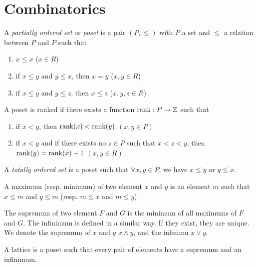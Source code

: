 \section{Combinatorics}

\begin{definition}
  A \textit{partially ordered set} or \textit{poset} is a pair $(P,\le)$ with $P$ a set and $\le$ a relation between $P$ and $P$ such that
  \begin{enumerate}
    \item $x \le x$ ($x \in R$)
    \item if $x \le y$ and $y \le x$, then $x = y$ ($x,y \in R$)
    \item if $x \le y$ and $y \le z$, then $x \le z$ ($x,y,z \in R$)
  \end{enumerate}
\end{definition}

\begin{definition}
  A poset is ranked if there exists a function $\operatorname{rank} : P \to \mathbb Z$ such that
  \begin{enumerate}
    \item if $x < y$, then $\operatorname{rank}(x) < \operatorname{rank}(y)$ $(x, y \in P)$
    \item if $x < y$ and if there exists no $z \in P$ such that $x < z < y$, then $\operatorname{rank}(y) = \operatorname{rank}(x) + 1$ $(x, y \in R)$.
  \end{enumerate}
\end{definition}

\begin{definition}
  A \textit{totally ordered set} is a poset such that $\forall x,y \in P$, we have $x \le y$ or $y \le x$.
\end{definition}

\begin{definition}
  A maximum (resp. minimum) of two element $x$ and $y$ is an element $m$ such that $x \le m$ and $y \le m$ (resp. $m \le x$ and $m \le y$).
\end{definition}

\begin{definition}
  The supremum of two element $F$ and $G$ is the minimum of all maximums of $F$ and $G$. The infinimum is defined in a similar way. If they exist, they are unique. We denote the supremum of $x$ and $y$ $x \wedge y$, and the infinimu $ x \vee y$.
\end{definition}

\begin{definition}[Lattice]
  A lattice is a poset such that every pair of elements have a supremum and an infinimum.
\end{definition}
